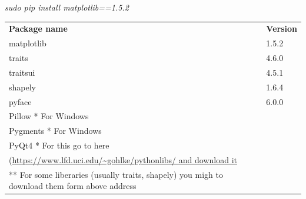 \documentclass[14pt]{article}
\begin{document}
\textit{sudo pip install matplotlib==1.5.2}
\vspace{20pt}
\begin{table}[]
\begin{tabular}{ll}
\textbf{Package name} &   \textbf{Version}\\
matplotlib	 & 	1.5.2  \\
traits		 &	4.6.0  \\
traitsui	 &	4.5.1  \\
shapely		 &	1.6.4  \\
pyface		 &	6.0.0  \\
Pillow      * For Windows \\ 
Pygments    * For Windows \\
PyQt4  * For this go to here\\
 (\url{https://www.lfd.uci.edu/~gohlke/pythonlibs/ and download it}\\
 
** For some liberaries (usually traits, shapely) you migh to download them form above address

                     
 & 
\end{tabular}
\end{table}

\end{document}

